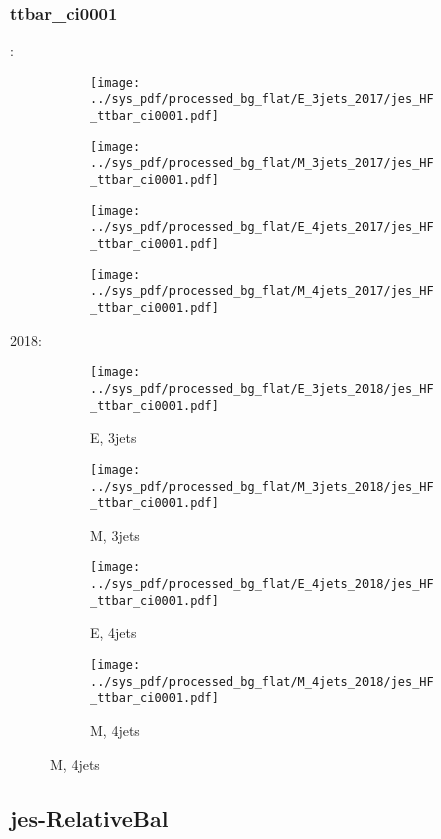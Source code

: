 \documentclass{beamer}
\begin{document}
\begin{frame}
\frametitle{ttbar_ci0001}
\fontsize{5}{1}:
\begin{figure}
\centering
\begin{subfigure}[b]{0.24\textwidth}
\texttt{[image: ../sys\_pdf/processed\_bg\_flat/E\_3jets\_2017/jes\_HF\_ttbar\_ci0001.pdf]}
\end{subfigure}
\begin{subfigure}[b]{0.24\textwidth}
\texttt{[image: ../sys\_pdf/processed\_bg\_flat/M\_3jets\_2017/jes\_HF\_ttbar\_ci0001.pdf]}
\end{subfigure}
\begin{subfigure}[b]{0.24\textwidth}
\texttt{[image: ../sys\_pdf/processed\_bg\_flat/E\_4jets\_2017/jes\_HF\_ttbar\_ci0001.pdf]}
\end{subfigure}
\begin{subfigure}[b]{0.24\textwidth}
\texttt{[image: ../sys\_pdf/processed\_bg\_flat/M\_4jets\_2017/jes\_HF\_ttbar\_ci0001.pdf]}
\end{subfigure}
\end{figure}
2018:
\begin{figure}
\centering
\begin{subfigure}[b]{0.24\textwidth}
\texttt{[image: ../sys\_pdf/processed\_bg\_flat/E\_3jets\_2018/jes\_HF\_ttbar\_ci0001.pdf]}
\captionsetup{font=tiny}
\caption{E, 3jets}
\end{subfigure}
\begin{subfigure}[b]{0.24\textwidth}
\texttt{[image: ../sys\_pdf/processed\_bg\_flat/M\_3jets\_2018/jes\_HF\_ttbar\_ci0001.pdf]}
\captionsetup{font=tiny}
\caption{M, 3jets}
\end{subfigure}
\begin{subfigure}[b]{0.24\textwidth}
\texttt{[image: ../sys\_pdf/processed\_bg\_flat/E\_4jets\_2018/jes\_HF\_ttbar\_ci0001.pdf]}
\captionsetup{font=tiny}
\caption{E, 4jets}
\end{subfigure}
\begin{subfigure}[b]{0.24\textwidth}
\texttt{[image: ../sys\_pdf/processed\_bg\_flat/M\_4jets\_2018/jes\_HF\_ttbar\_ci0001.pdf]}
\captionsetup{font=tiny}
\caption{M, 4jets}
\end{subfigure}
\end{figure}
\end{frame}


\subsection{jes-RelativeBal}
\end{document}
